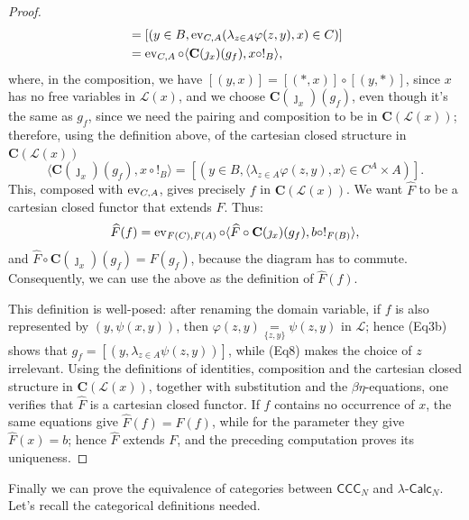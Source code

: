 \begin{proof}
\begin{align*}
          &= [(y \in B,\operatorname{ev}_{C,A}(\lambda_{z \in A}\varphi(z,y),x) \in C)] \\
          &= \operatorname{ev}_{C,A} \circ \langle \mathbf C(\jmath_x)(g_f),x \circ !_B\rangle,
    \end{align*}
    where, in the composition, we have $[(y,x)] = [(*,x)] \circ [(y,*)]$, since $x$ has no free variables in $\mathcal L(x)$, and we choose $\mathbf C(\jmath_x)(g_f)$, even though it's the same as $g_f$, since we need the pairing and composition to be in $\mathbf C(\mathcal L(x))$;
    therefore, using the definition above, of the cartesian closed structure in $\mathbf C(\mathcal L(x))$
    \[ \langle \mathbf C(\jmath_x)(g_f),x \circ !_B\rangle = [(y \in B,\langle \lambda_{z \in A}\varphi(z,y),x\rangle \in C^A \times A)]. \]
    This, composed with $\operatorname{ev}_{C,A}$, gives precisely $f$ in $\mathbf C(\mathcal L(x))$.\newline
    We want $\widehat F$ to be a cartesian closed functor that extends $F$. Thus:
    \[ \widehat F(f) = \operatorname{ev}_{F(C),F(A)} \circ \langle \widehat F \circ \mathbf C(\jmath_x)(g_f),b \circ !_{F(B)}\rangle, \]
    and $\widehat F \circ \mathbf C(\jmath_x)(g_f) = F(g_f)$, because the diagram has to commute. Consequently, we can use the above as the definition of $\widehat F(f)$.\par
    This definition is well-posed: after renaming the domain variable, if $f$ is also represented by $(y,\psi(x,y))$, then $\varphi(z,y) \underset{\{z,y\}}{=} \psi(z,y)$ in $\mathcal L$; hence (Eq3b) shows that $g_f = [(y,\lambda_{z \in A}\psi(z,y))]$, while (Eq8) makes the choice of $z$ irrelevant. Using the definitions of identities, composition and the cartesian closed structure in $\mathbf C(\mathcal L(x))$, together with substitution and the $\beta\eta$-equations, one verifies that $\widehat F$ is a cartesian closed functor. If $f$ contains no occurrence of $x$, the same equations give $\widehat F(f)=F(f)$, while for the parameter they give $\widehat F(x)=b$; hence $\widehat F$ extends $F$, and the preceding computation proves its uniqueness.
\end{proof}

Finally we can prove the equivalence of categories between $\mathsf{CCC}_N$ and $\lambda\text{-}\mathsf{Calc}_N$. Let's recall the categorical definitions needed.

